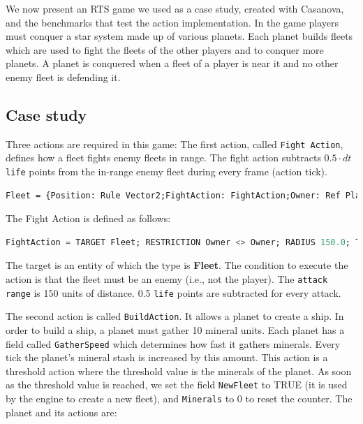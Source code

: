 We now present an RTS game we used as a case study, created with Casanova, and the benchmarks that test the action implementation. In the game players must conquer a star system made up of various planets. Each planet builds fleets which are used to fight the fleets of the other players and to conquer more planets. A planet is conquered when a fleet of a player is near it and no other enemy fleet is defending it.

\subsection{Case study}

Three actions are required in this game: The first action, called \texttt{Fight Action}, defines how a fleet fights enemy fleets in range. The fight action subtracts $0.5 \cdot dt$ \texttt{life} points from the in-range enemy fleet during every frame (action tick).

\begin{lstlisting}[language=Caml]
Fleet = {Position: Rule Vector2;FightAction: FightAction;Owner: Ref Player;Life: Var float32;Fight: FightAction }
\end{lstlisting}

The Fight Action is defined as follows:

\begin{lstlisting}[language=sql]
FightAction = TARGET Fleet; RESTRICTION Owner <> Owner; RADIUS 150.0; TRANSFER CONSTANT Life - 0.5;
\end{lstlisting}

The target is an entity of which the type is \textbf{Fleet}. The condition to execute the action is that the fleet must be an enemy (i.e., not the player). The \texttt{attack range} is 150 units of distance. 0.5 \texttt{life} points are subtracted for every attack.

The second action is called \texttt{BuildAction}. It allows a planet to create a ship. In order to build a ship, a planet must gather 10 mineral units. Each planet has a field called \texttt{GatherSpeed} which determines how fast it gathers minerals. Every tick the planet's mineral stash is increased by this amount. This action is a threshold action where the threshold value is the minerals of the planet. As soon as the threshold value is reached, we set the field \texttt{NewFleet} to TRUE (it is used by the engine to create a new fleet), and \texttt{Minerals} to 0 to reset the counter. The planet and its actions are:


